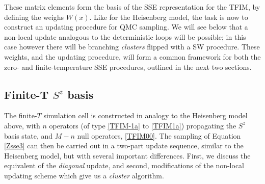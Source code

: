 \documentclass[vecphys]{svmult}
\begin{document}
These matrix elements form the basis of the SSE representation for the TFIM, by defining the weighs $W(x)$.  Like for the Heisenberg model, the task is now to construct an updating procedure for QMC sampling.
We will see below that a non-local update analogous to the deterministic loops will be possible; in this case however there will be branching {\it clusters} flipped with a SW procedure.  These weights, and the updating procedure, will form a common framework for both the zero- and finite-temperature SSE procedures, outlined in the next two sections.

\subsection{Finite-T $S^z$ basis} \label{Melko:TFIMfiniteT}

The finite-$T$ simulation cell is constructed in analogy to the Heisenberg model above, with $n$ operators (of type \ref{TFIM-1a} to \ref{TFIM1a}) propagating the $S^z$ basis state, and $M-n$ null operators, \ref{TFIM00}.
The sampling of Equation \ref{Zsse3} can then be carried out in a two-part update sequence, similar to the Heisenberg model, but with several important differences.  First, we discuss the equivalent of the {\em diagonal} update, and second, modifications of the non-local updating scheme which give us a {\em cluster} algorithm.
\end{document}
